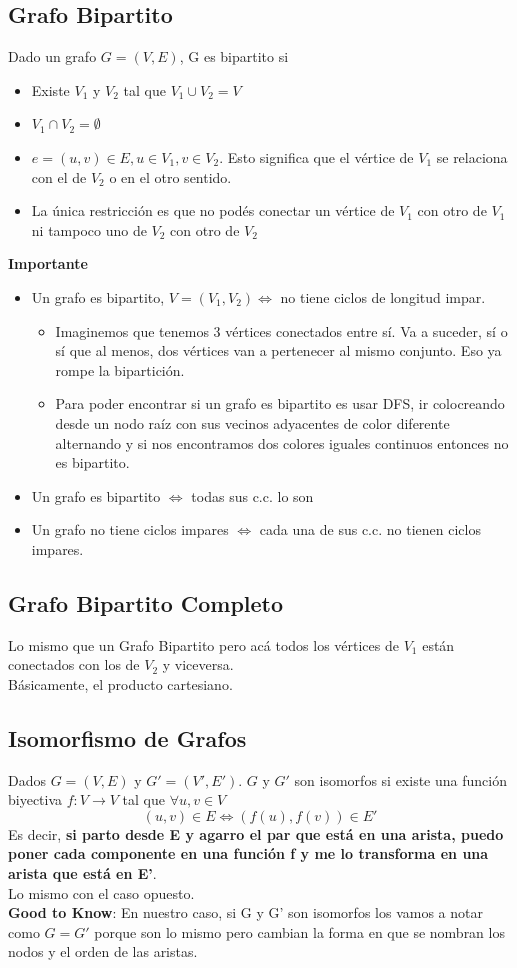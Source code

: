 \documentclass[10pt,a4paper]{article}
\begin{document}
\subsection*{Grafo Bipartito}
Dado un grafo $G = (V, E)$, G es bipartito si
\begin{itemize}
    \item Existe $V_{1}$ y $V_{2}$ tal que $V_{1} \cup V_{2} = V$
    \item $V_{1} \cap V_{2} = \emptyset$
    \item $e = (u,v) \in E, u \in V_{1}, v \in V_{2}$. Esto significa que el vértice de $V_{1}$ se relaciona con el de $V_{2}$ o en el otro sentido. 
    \item La única restricción es que no podés conectar un vértice de $V_{1}$ con otro de $V_{1}$ ni tampoco uno de $V_{2}$ con otro de $V_{2}$
\end{itemize}
\textbf{Importante}
\begin{itemize}
    \item Un grafo es bipartito, $V = (V_{1}, V_{2}) \iff$ no tiene ciclos de longitud impar.
    \begin{itemize}
        \item Imaginemos que tenemos 3 vértices conectados entre sí. Va a suceder, sí o sí que al menos, dos vértices van a pertenecer al mismo conjunto. Eso ya rompe la bipartición. 
        \item Para poder encontrar si un grafo es bipartito es usar DFS, ir colocreando desde un nodo raíz con sus vecinos adyacentes de color diferente alternando y si nos encontramos dos colores iguales continuos entonces no es bipartito.
    \end{itemize}
    \item Un grafo es bipartito $\iff$ todas sus c.c. lo son 
    \item Un grafo no tiene ciclos impares $\iff$ cada una de sus c.c. no tienen ciclos impares.
\end{itemize}
\subsection*{Grafo Bipartito Completo}
Lo mismo que un Grafo Bipartito pero acá todos los vértices de $V_{1}$ están conectados con los de $V_{2}$ y viceversa. \\
Básicamente, el producto cartesiano.
\subsection*{Isomorfismo de Grafos}
Dados  $G = (V, E)$ y $G' = (V', E')$. $G$ y $G'$ son isomorfos si existe una función biyectiva $f: V \rightarrow V$ tal que $\forall u,v \in V$ 
\[(u,v) \in E \iff (f(u), f(v)) \in E'\]
Es decir, \textbf{si parto desde E y agarro el par que está en una arista, puedo poner cada componente en una función f y me lo transforma en una arista que está en E'}. \\
Lo mismo con el caso opuesto. \\
\textbf{Good to Know}: En nuestro caso, si G y G' son isomorfos los vamos a notar como $G = G'$ porque son lo mismo pero cambian la forma en que se nombran los nodos y el orden de las aristas.
\end{document}
